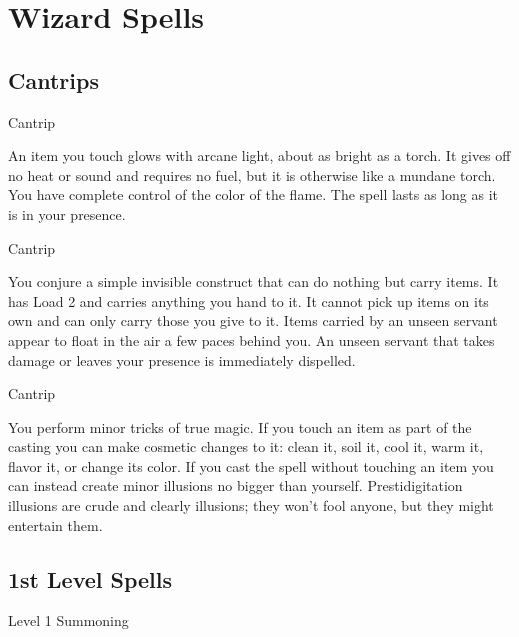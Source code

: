 \chapter{Wizard Spells}
   
 


\section{Cantrips}   
 
\startSpellName
{} 	Cantrip
\stopSpellName
 

An item you touch glows with arcane light, about as bright as a torch. It gives off no heat or sound and requires no fuel, but it is otherwise like a mundane torch. You have complete control of the color of the flame. The spell lasts as long as it is in your presence.

 
\startSpellName
{} 	Cantrip
\stopSpellName
 

You conjure a simple invisible construct that can do nothing but carry items. It has Load 2 and carries anything you hand to it. It cannot pick up items on its own and can only carry those you give to it. Items carried by an unseen servant appear to float in the air a few paces behind you. An unseen servant that takes damage or leaves your presence is immediately dispelled.

 
\startSpellName
{} 	Cantrip
\stopSpellName
 

You perform minor tricks of true magic. If you touch an item as part of the casting you can make cosmetic changes to it: clean it, soil it, cool it, warm it, flavor it, or change its color. If you cast the spell without touching an item you can instead create minor illusions no bigger than yourself. Prestidigitation illusions are crude and clearly illusions; they won't fool anyone, but they might entertain them.



 


\section{1st Level Spells}     
 
\startSpellName
{} 	Level 1	Summoning
\stopSpellName
 

